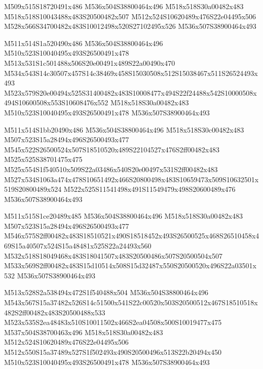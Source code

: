 \documentclass{article}
\begin{document}
\begin{multicols}{5}
\begin{center}
M509x515S18720491x486 %
M536x504S38800464x496 %
M518x518S30a00482x483 %
M518x518S10043488x483S20500482x507 %
M512x524S10620489x476S22e04495x506 %
M528x566S34700482x483S10012498x520S27102495x526 %
M536x507S38900464x493 %
\vfil
\columnbreak

M511x514S1a520490x486 %
M536x504S38800464x496 %
M510x523S10040495x493S26500491x478 %
M513x531S1c501488x506S20e00491x489S22a00490x470 %
M534x543S14c30507x457S14c38469x458S15030508x512S15038467x511S26524493x493 %
M523x579S20e00494x525S31400482x483S10008477x494S22f24488x542S10000508x494S10600508x553S10608476x552 %
M518x518S30a00482x483 %
M510x523S10040495x493S26500491x478 %
M536x507S38900464x493 %
\vfil
\columnbreak

M511x514S1bb20490x486 %
M536x504S38800464x496 %
M518x518S30c00482x483 %
M507x523S15a28494x496S26500493x477 %
M545x522S26500524x507S18510520x489S22104527x476S2ff00482x483 %
M525x525S38701475x475 %
M525x554S1f540510x509S22a03486x540S20e00497x531S2ff00482x483 %
M527x534S1063a474x478S10651492x466S20800498x483S10659473x509S10632501x519S20800489x524 %
M522x525S11541498x491S11549479x498S20600489x476 %
M536x507S38900464x493 %
\vfil
\columnbreak

M511x515S1ce20489x485 %
M536x504S38800464x496 %
M518x518S30a00482x483 %
M507x523S15a28494x496S26500493x477 %
M546x575S2ff00482x483S18510521x490S18518452x493S26500525x468S26510458x469S15a40507x524S15a48481x525S22a24493x560 %
M532x518S18049468x483S18041507x483S20500486x507S20500504x507 %
M533x569S2ff00482x483S15d10514x508S15d32487x550S20500520x496S22a03501x532 %
M536x507S38900464x493 %
\vfil
\columnbreak

M513x528S2a538494x472S1f540488x504 %
M536x504S38800464x496 %
M543x567S15a37482x526S14c51500x541S22c00520x503S20500512x467S18510518x482S2ff00482x483S20500488x533 %
M523x535S2ea48483x510S10011502x466S2ea04508x500S10019477x475 %
M537x504S38700463x496 %
M518x518S30a00482x483 %
M512x524S10620489x476S22e04495x506 %
M512x550S15a37489x527S1f502493x490S20500496x513S22b20494x450 %
M510x523S10040495x493S26500491x478 %
M536x507S38900464x493 %
\vfil

\end{center}
\end{multicols}
\end{document}
